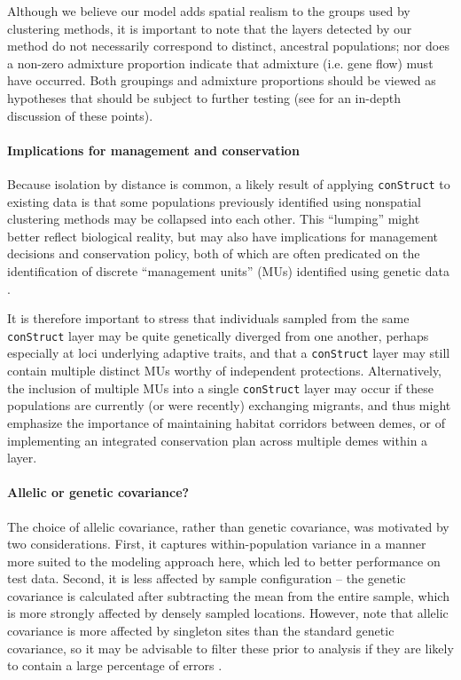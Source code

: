 \documentclass[10pt,letterpaper]{article}
\begin{document}
Although we believe our model adds spatial realism to the groups used by clustering methods,
it is important to note that the layers detected by our method 
do not necessarily correspond  to distinct, ancestral populations; 
nor does a non-zero admixture proportion indicate that admixture 
(i.e. gene flow) must have occurred. 
Both groupings and admixture proportions
should be viewed as hypotheses that should be subject to further testing
(see \cite{Falush:16} for an in-depth discussion of these points).

\paragraph{Implications for management and conservation}
Because isolation by distance is common, 
a likely result of applying \texttt{conStruct} to existing data is that some
populations previously identified using nonspatial clustering methods 
may be collapsed into each other.  
This ``lumping'' might better reflect biological reality, 
but may also have implications for management decisions and conservation policy, 
both of which are often predicated on the identification of discrete ``management units'' (MUs) 
identified using genetic data \cite{Moritz1994,Waples_1998,Moritz_etal_2002}.

It is therefore important to stress that individuals sampled from the same \texttt{conStruct} layer 
may be quite genetically diverged from one another, 
perhaps especially at loci underlying adaptive traits, 
and that a \texttt{conStruct} layer may still contain multiple distinct MUs worthy of independent protections.  
Alternatively, the inclusion of multiple MUs into a single \texttt{conStruct} layer 
may occur if these populations are currently 
(or were recently) exchanging migrants, 
and thus might emphasize the importance of maintaining habitat corridors between demes, 
or of implementing an integrated conservation plan across multiple demes within a layer.

\paragraph{Allelic or genetic covariance?}
The choice of allelic covariance, rather than genetic covariance,
was motivated by two considerations.
First, it captures within-population variance in a manner more suited to the modeling approach here,
which led to better performance on test data.
Second, it is less affected by sample configuration --
the genetic covariance is calculated after subtracting the mean from the entire sample,
which is more strongly affected by densely sampled locations.
However, note that allelic covariance is more affected by singleton sites
than the standard genetic covariance,
so it may be advisable to filter these prior to analysis
if they are likely to contain a large percentage of errors \cite{linck_battey2017}.
\end{document}
